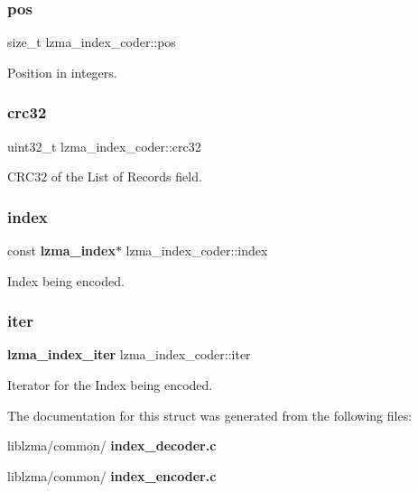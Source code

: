 \subsubsection{pos}
{\footnotesize\ttfamily size\+\_\+t lzma\+\_\+index\+\_\+coder\+::pos}



Position in integers. 

\mbox{\label{structlzma__index__coder_adf63e83bff9998c0a3f1d3fafb5d6477}} 
\subsubsection{crc32}
{\footnotesize\ttfamily uint32\+\_\+t lzma\+\_\+index\+\_\+coder\+::crc32}



C\+R\+C32 of the List of Records field. 

\mbox{\label{structlzma__index__coder_ad977689944cd04f670564a297957f3a6}} 
\subsubsection{index\hspace{0.1cm}{\footnotesize\ttfamily [2/2]}}
{\footnotesize\ttfamily const \textbf{ lzma\+\_\+index}$\ast$ lzma\+\_\+index\+\_\+coder\+::index}



Index being encoded. 

\mbox{\label{structlzma__index__coder_a2175d032c156db3ec81737919c106c57}} 
\subsubsection{iter}
{\footnotesize\ttfamily \textbf{ lzma\+\_\+index\+\_\+iter} lzma\+\_\+index\+\_\+coder\+::iter}



Iterator for the Index being encoded. 



The documentation for this struct was generated from the following files\+:\begin{DoxyCompactItemize}
\item 
liblzma/common/\textbf{ index\+\_\+decoder.\+c}\item 
liblzma/common/\textbf{ index\+\_\+encoder.\+c}\end{DoxyCompactItemize}
